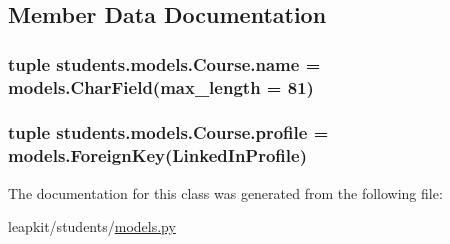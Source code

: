\subsection{Member Data Documentation}
\hypertarget{classstudents_1_1models_1_1_course_a6167f80718f9a71b41abba99105a079c}{
\subsubsection[{name}]{\setlength{\rightskip}{0pt plus 5cm}tuple students.\-models.\-Course.\-name = models.\-Char\-Field(max\-\_\-length = 81)\hspace{0.3cm}{\ttfamily [static]}}}\label{classstudents_1_1models_1_1_course_a6167f80718f9a71b41abba99105a079c}
\hypertarget{classstudents_1_1models_1_1_course_aadeceab75e5b99ede00f30b2f56da749}{
\subsubsection[{profile}]{\setlength{\rightskip}{0pt plus 5cm}tuple students.\-models.\-Course.\-profile = models.\-Foreign\-Key({\bf Linked\-In\-Profile})\hspace{0.3cm}{\ttfamily [static]}}}\label{classstudents_1_1models_1_1_course_aadeceab75e5b99ede00f30b2f56da749}


The documentation for this class was generated from the following file\-:\begin{DoxyCompactItemize}
\item 
leapkit/students/\hyperlink{models_8py}{models.\-py}\end{DoxyCompactItemize}
